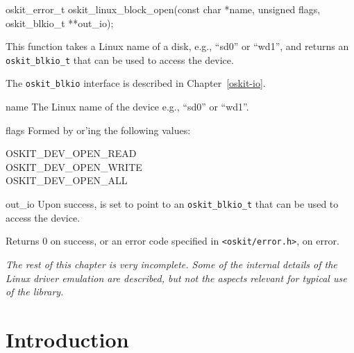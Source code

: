 \begin{apisyn}

	\funcproto oskit_error_t oskit_linux_block_open(const char *name,
					unsigned flags,
					\outparam oskit_blkio_t **out_io);
\end{apisyn}
\begin{apidesc}
	This function takes a Linux name of a disk,
	e.g., ``sd0'' or ``wd1'',
	and returns an \texttt{oskit_blkio_t} that can be used to access
	the device.

	The \texttt{oskit_blkio} interface is described in
	Chapter~\ref{oskit-io}.
\end{apidesc}
\begin{apiparm}
	\item[name]
		The Linux name of the device
		e.g., ``sd0'' or ``wd1''.

	\item[flags]
		Formed by or'ing the following values:
		\begin{description}
		\item[OSKIT_DEV_OPEN_READ]
		\item[OSKIT_DEV_OPEN_WRITE]
		\item[OSKIT_DEV_OPEN_ALL]
		\end{description}

	\item[out_io]
		Upon success, is set to point to an \texttt{oskit_blkio_t}
		that can be used to access the device.
\end{apiparm}
\begin{apiret}
	Returns 0 on success, or an error code specified in
	{\tt <oskit/error.h>}, on error.
\end{apiret}








\newpage
\emph{The rest of this chapter is very incomplete.
Some of the internal details of the Linux driver emulation are described,
but not the aspects relevant for typical use of the library.}

\section{Introduction}

